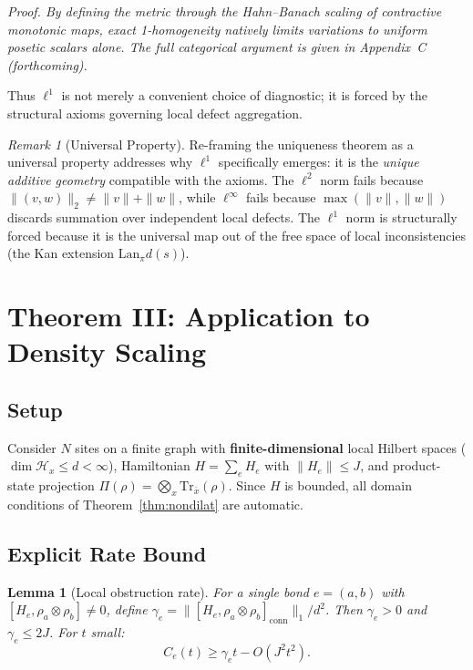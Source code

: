 \documentclass[12pt,a4paper]{amsart}
\theoremstyle{plain}
\newtheorem{lemma}[theorem]{Lemma}
\theoremstyle{definition}
\theoremstyle{remark}
\newtheorem{remark}[theorem]{Remark}
\newcommand{\Lan}{\mathrm{Lan}}
\newcommand{\tr}{\mathrm{Tr}}
\begin{document}
\noindent\emph{Proof.  By defining the metric through the Hahn--Banach
scaling of contractive monotonic maps, exact 1-homogeneity natively
limits variations to uniform posetic scalars alone.
The full categorical argument is given in Appendix~C
(forthcoming).}

\noindent Thus $\ell^1$ is not merely a convenient choice of
diagnostic; it is forced by the structural axioms governing local
defect aggregation.

\begin{remark}[Universal Property]
Re-framing the uniqueness theorem as a universal property addresses
why $\ell^1$ specifically emerges: it is the \emph{unique additive
geometry} compatible with the axioms. The $\ell^2$ norm fails because
$\|(v,w)\|_2 \neq \|v\| + \|w\|$, while $\ell^\infty$ fails because
$\max(\|v\|, \|w\|)$ discards summation over independent local
defects. The $\ell^1$ norm is structurally forced because it is the
universal map out of the free space of local inconsistencies (the Kan
extension $\Lan_\pi d(s)$).
\end{remark}



\section{Theorem III: Application to Density Scaling}\label{sec:thm3}

\subsection{Setup}

Consider $N$ sites on a finite graph with \textbf{finite-dimensional}
local Hilbert spaces ($\dim \mathcal{H}_x \leq d < \infty$),
Hamiltonian $H = \sum_e H_e$ with $\|H_e\| \leq J$, and
product-state projection
$\Pi(\rho) = \bigotimes_x \tr_{\bar{x}}(\rho)$.
Since $H$ is bounded, all domain conditions of
Theorem~\ref{thm:nondilat} are automatic.

\subsection{Explicit Rate Bound}

\begin{lemma}[Local obstruction rate]\label{lem:rate}
For a single bond $e = (a,b)$ with
$[H_e, \rho_a \otimes \rho_b] \neq 0$, define
$\gamma_e = \|[H_e, \rho_a \otimes \rho_b]_{\mathrm{conn}}\|_1 / d^2$.
Then $\gamma_e > 0$ and $\gamma_e \leq 2J$. For $t$ small:
\[
  C_e(t) \geq \gamma_e t - O(J^2 t^2).
\]
\end{lemma}
\end{document}
